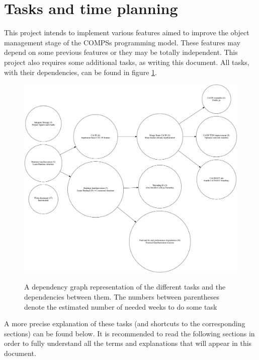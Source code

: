 \section{Tasks and time planning}
\label{sec:tasks_and_time_planning}
This project intends to implement various features aimed to improve the object management stage of the COMPSs programming model. These features may depend on some previous features or they may be totally independent. This project also requires some additional tasks, as writing this document. All tasks, with their dependencies, can be found in figure \ref{fig:thesis_task_graph}.

\begin{figure}[ht!]
\includegraphics[scale = 0.20]{figures/thesis_task_graph.png}
\label{fig:thesis_task_graph}
\caption{A dependency graph representation of the different tasks and the dependencies between them. The numbers between parentheses denote the estimated number of needed weeks to do some task}
\end{figure}

A more precise explanation of these tasks (and shortcuts to the corresponding sections) can be found below. It is recommended to read the following sections in order to fully understand all the terms and explanations that will appear in this document.

